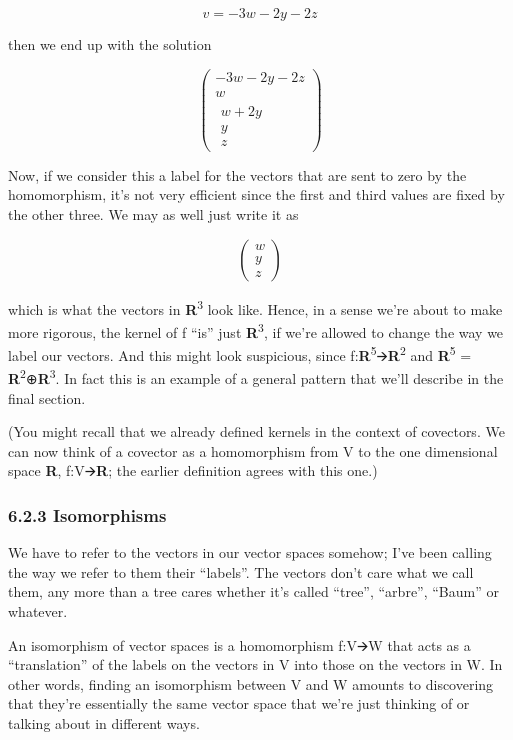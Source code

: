 \documentclass[oneside,english]{amsbook}
\numberwithin{section}{chapter}
\theoremstyle{plain}
\theoremstyle{definition}
\begin{document}
\[v = - 3w - 2y - 2z\]

then we end up with the solution

\[\begin{pmatrix}
	- 3w - 2y - 2z \\
	w \\
	\begin{matrix}
		w + 2y \\
		y \\
		z
	\end{matrix}
\end{pmatrix}\]

Now, if we consider this a label for the vectors that are sent to zero
by the homomorphism, it's not very efficient since the first and third
values are fixed by the other three. We may as well just write it as

\[\begin{pmatrix}
	w \\
	y \\
	z
\end{pmatrix}\]

which is what the vectors in \textbf{R}\textsuperscript{3} look like.
Hence, in a sense we're about to make more rigorous, the kernel of f
``is'' just \textbf{R}\textsuperscript{3}, if we're allowed to change
the way we label our vectors. And this might look suspicious, since
f:\textbf{R}\textsuperscript{5}🡪\textbf{R}\textsuperscript{2} and
\textbf{R}\textsuperscript{5} =
\textbf{R}\textsuperscript{2}⊕\textbf{R}\textsuperscript{3}. In fact
this is an example of a general pattern that we'll describe in the final
section.

(You might recall that we already defined kernels in the context of
covectors. We can now think of a covector as a homomorphism from V to
the one dimensional space \textbf{R}, f:V🡪\textbf{R}; the earlier
definition agrees with this one.)

\subsubsection{6.2.3 Isomorphisms}\label{isomorphisms}

We have to refer to the vectors in our vector spaces somehow; I've been
calling the way we refer to them their ``labels''. The vectors don't
care what we call them, any more than a tree cares whether it's called
``tree'', ``arbre'', ``Baum'' or whatever.

An isomorphism of vector spaces is a homomorphism f:V🡪W that acts as a
``translation'' of the labels on the vectors in V into those on the
vectors in W. In other words, finding an isomorphism between V and W
amounts to discovering that they're essentially the same vector space
that we're just thinking of or talking about in different ways.
\end{document}
